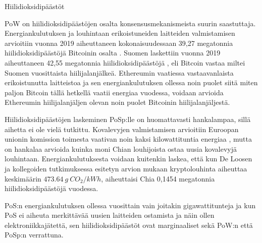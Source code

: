\begin{section}{Hiilidioksidipäästöt\label{hiilidioksidipaastot}}

PoW on hiilidioksidipäästöjen osalta konsensusmekanismeista suurin saastuttaja. Energiankulutuksen ja louhintaan erikoistuneiden laitteiden valmistamisen arvioitiin vuonna 2019 aiheuttaneen kokonaisuudessaan 39,27 megatonnia hiilidioksidipäästöjä Bitcoinin osalta \cite{btc-carbon-ewaste}. Suomen laskettiin vuonna 2019 aiheuttaneen 42,55 megatonnia hiilidioksidipäästöjä \cite{carbon-finland}, eli Bitcoin vastaa miltei Suomen vuosittaista hiilijalanjälkeä. Ethereumin vaatiessa vastaavanlaista erikoistunutta laitteistoa ja sen energiankulutuksen ollessa noin puolet siitä miten paljon Bitcoin tällä hetkellä vaatii energiaa vuodessa, voidaan arvioida Ethereumin hiilijalanjäljen olevan noin puolet Bitcoinin hiilijalanjäljestä.

Hiilidioksidipäästöjen laskeminen PoSp:lle on huomattavasti hankalampaa, sillä aihetta ei ole vielä tutkittu. Kovalevyjen valmistamisen arvioitiin Euroopan unionin komission toimesta vaativan noin kaksi kilowattituntia energiaa \cite{manufacturingcarbon1}, mutta on hankalaa arvioida kuinka moni Chian louhijoista ostaa uusia kovalevyjä louhintaan. Energiankulutuksesta voidaan kuitenkin laskea, että kun De Loosen ja kollegoiden tutkimuksessa \cite{btc-carbon-ewaste} esitetyn arvion mukaan kryptolouhinta aiheuttaa keskimäärin \(473.64~g~CO_{2}/kWh \), aiheuttaisi Chia 0,1454 megatonnia hiilidioksidipäästöjä vuodessa.

PoS:n energiankulutuksen ollessa vuosittain vain joitakin gigawattitunteja ja kun PoS ei aiheuta merkittävää uusien laitteiden ostamista ja näin ollen elektroniikkajätettä, sen hiilidioksidipäästöt ovat marginaaliset sekä PoW:n että PoSp:n verrattuna.

\end{section}